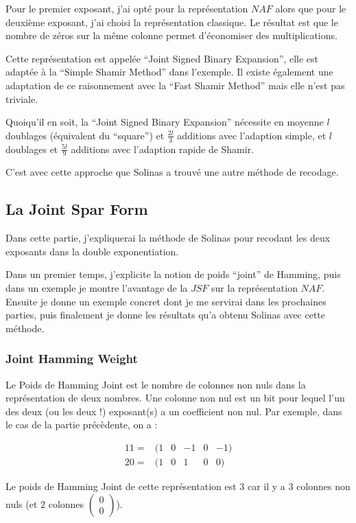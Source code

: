 \documentclass[12pt, a4paper]{memoir}
\newcommand{\doublezero}{\begin{pmatrix} 0 \\ 0 \end{pmatrix}}
\begin{document}
  Pour le premier exposant, j'ai opté pour la représentation $NAF$ alors que pour le deuxième exposant, j'ai choisi la représentation classique.
  Le résultat est que le nombre de zéros sur la même colonne permet d'économiser des multiplications.
  
  Cette représentation est appelée ``Joint Signed Binary Expansion'', elle est adaptée à la ``Simple Shamir Method'' dans l'exemple.
  Il existe également une adaptation de ce raisonnement avec la ``Fast Shamir Method'' mais elle n'est pas triviale.
  
  Quoiqu'il en soit, la ``Joint Signed Binary Expansion'' nécessite en moyenne $l$ doublages (équivalent du ``square'')
  et $\frac{2l}{3}$ additions avec l'adaption simple, et $l$ doublages et $\frac{5l}{9}$ additions avec l'adaption rapide de Shamir.
  
  C'est avec cette approche que Solinas a trouvé une autre méthode de recodage.

\subsection{La Joint Spar Form}

Dans cette partie, j'expliquerai la méthode de Solinas pour recodant les deux exposants dans la double exponentiation.

Dans un premier temps, j'explicite la notion de poids ``joint'' de Hamming, puis dans un exemple je montre l'avantage de la
$JSF$ sur la représentation $NAF$. Ensuite je donne un exemple concret dont je me servirai dans les prochaines parties,
puis finalement je donne les résultats qu'a obtenu Solinas avec cette méthode.

\subsubsection{Joint Hamming Weight}

Le Poids de Hamming Joint est le nombre de colonnes non nuls dans la représentation de deux nombres.
Une colonne non nul est un bit pour lequel l'un des deux (ou les deux !) exposant(s) a un coefficient non nul.
Par exemple, dans le cas de la partie précèdente, on a :

  $$\begin{array}{ccccccc}
  11 = & (1 & 0 & -1 & 0 & -1) \\
  20 = & (1 & 0 & 1 & 0 & 0)
  \end{array}$$

Le poids de Hamming Joint de cette représentation est $3$ car il y a $3$ colonnes non nuls (et $2$ colonnes $\doublezero$).
\end{document}
